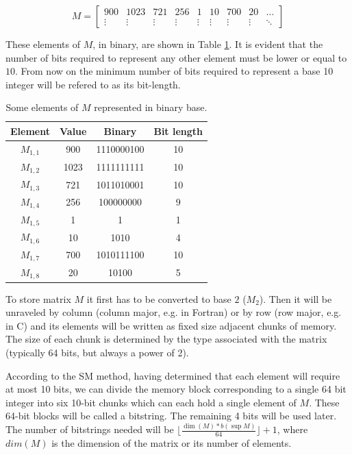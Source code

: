 \documentclass[10pt]{article}
\begin{document}
\begin{equation} \label{eq:02}
  M = \begin{bmatrix}
  900 & 1023 & 721 & 256 & 1 & 10 & 700 & 20 & \hdots\\ 
  \vdots & \vdots & \vdots & \vdots & \vdots & \vdots & \vdots & \vdots & \ddots 
  \end{bmatrix}
\end{equation}

These elements of $M$, in binary, are shown in Table \ref{tab:01}. It is evident that the number of bits required to represent any other element must be lower or equal to $10$. From now on the minimum number of bits required to represent a base 10 integer will be refered to as its bit-length.

\begin{table}[h]
 \centering
 \caption{Some elements of $M$ represented in binary base.}
 \begin{tabular}{cccc} 
  \hline 
  Element & Value  & Binary & Bit length\\
  \hline
  $M_{1,1}$ & 900  & 1110000100 & 10\\
  $M_{1,2}$ & 1023 & 1111111111 & 10\\
  $M_{1,3}$ & 721  & 1011010001 & 10\\
  $M_{1,4}$ & 256  & 100000000  & 9\\
  $M_{1,5}$ & 1    & 1          & 1\\
  $M_{1,6}$ & 10   & 1010       & 4\\
  $M_{1,7}$ & 700  & 1010111100 & 10\\
  $M_{1,8}$ & 20   & 10100      & 5\\
  \hline
 \end{tabular}
 \label{tab:01}
\end{table}

To store matrix $M$ it first has to be converted to base $2$ ($M_2$). Then it will be unraveled by column (column major, e.g. in Fortran) or by row (row major, e.g. in C) and its elements will be written as  fixed size adjacent chunks of memory. The size of each chunk is determined by the type associated with the matrix (typically 64 bits, but always a power of 2).

According to the SM method, having determined that each element will require at most 10 bits, we can divide the memory block corresponding to a single 64 bit integer into six 10-bit chunks which can each hold a single element of $M$. These 64-bit blocks will be called a bitstring. The remaining 4 bits will be used later. The number of bitstrings needed will be $\lfloor \frac{\dim(M) *b(\sup M)} {64} \rfloor +1$, where $dim(M)$ is the dimension of the matrix or its number of elements.
\end{document}
